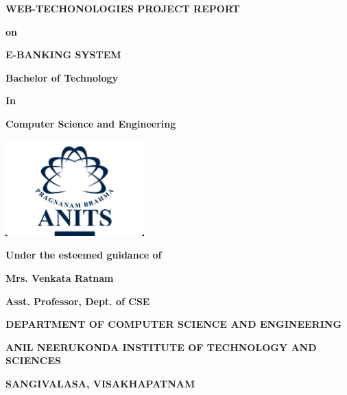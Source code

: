 \begin{titlepage}
    \centering
    {\fontsize{24}{28}\selectfont\bfseries WEB-TECHONOLOGIES PROJECT REPORT\par}
    \vspace{0.3cm}
    {\fontsize{18}{22}\selectfont\bfseries on\par}
    \vspace{0.3cm}
    {\fontsize{24}{28}\selectfont\bfseries E-BANKING SYSTEM\par}
    \vspace{1cm}
    {\fontsize{18}{22}\selectfont\bfseries Bachelor of Technology\par}
    \vspace{0.1cm}
    {\fontsize{18}{22}\selectfont\bfseries In\par}
    \vspace{0.1cm}
    {\fontsize{18}{22}\selectfont\bfseries Computer Science and Engineering\par}
    \includegraphics[width=0.4\textwidth]{anits_logo.png}\par
    \vspace{1cm}
    {\fontsize{18}{22}\selectfont\bfseries Under the esteemed guidance of\par}
    \vspace{0.2cm}
    {\fontsize{18}{22}\selectfont\bfseries Mrs. Venkata Ratnam\par}
    \vspace{0.2cm}
    {\fontsize{18}{22}\selectfont\bfseries Asst. Professor, Dept. of CSE\par}
    \vspace{1cm}
    {\fontsize{18}{22}\selectfont\bfseries DEPARTMENT OF COMPUTER SCIENCE AND ENGINEERING\par}
    \vspace{0.3cm}
    {\fontsize{18}{22}\selectfont\bfseries ANIL NEERUKONDA INSTITUTE OF TECHNOLOGY AND SCIENCES\par}
    \vspace{0.3cm}
    {\fontsize{18}{22}\selectfont\bfseries SANGIVALASA, VISAKHAPATNAM\par}
\end{titlepage}

